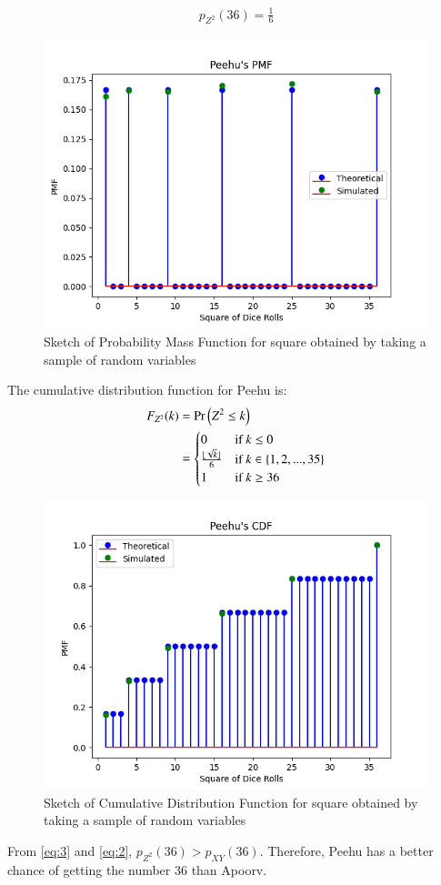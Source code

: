 \documentclass[journal,12pt,twocolumn]{IEEEtran}
\theoremstyle{remark}
\begin{document}
\begin{enumerate}
\begin{align}
        p_{Z^2}(36) = \frac{1}{6} \label{eq:2}
    \end{align}
    \begin{figure}[h!]
    	\centering
        \includegraphics[width=0.7\columnwidth]{exemplar/10/13/2/7/plots/Peehu_PMF.png}
        \caption{Sketch of Probability Mass Function for square obtained by taking a sample of random variables}
    \end{figure}
    The cumulative distribution function for Peehu is:
    \begin{align}
        F_{Z^2}(k) &= \Pr\left(Z^2 \leq k\right)\\
        &= 
        \begin{cases}
            0 & \text{if }k \leq 0\\
            \frac{\lfloor\sqrt{k}\rfloor}{6} & \text{if }k \in \{1, 2, ..., 35\}\\
            1 & \text{if }k \geq 36
        \end{cases}
    \end{align}
    \begin{figure}[h!]
    	\centering
        \includegraphics[width=0.7\columnwidth]{exemplar/10/13/2/7/plots/Peehu_CDF.png}
        \caption{Sketch of Cumulative Distribution Function for square obtained by taking a sample of random variables}
    \end{figure}
\end{enumerate}
From \eqref{eq:3} and \eqref{eq:2}, $p_{Z^2}(36) > p_{XY}(36)$. Therefore, Peehu has a better chance of getting the number 36 than Apoorv.
\end{document}
